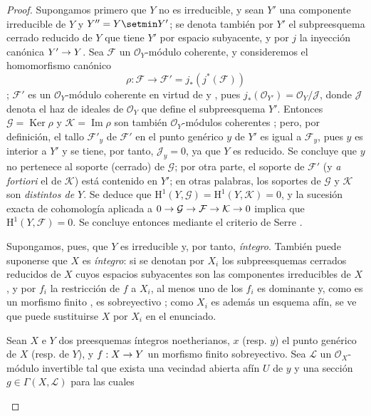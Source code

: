 \documentclass[oneside,10pt]{amsart}
\makeatletter
\newcommand{\ega@arrow}[2]{\mathchoice{#1}{#2}{#2}{#2}}
\renewcommand{\to}{\ega@arrow{\longrightarrow}{\rightarrow}}
\newcommand{\oldpage}[2][]{\marginnote{\normalfont\footnotesize\textbf{#1}~|~#2}\ignorespaces}
\let\EGAOriginalLabel\label
\renewcommand{\label}[1]{\phantomsection\EGAOriginalLabel{#1}}
\makeatother
\begin{document}
\begin{proof}
Supongamos primero que $Y$ no es irreducible, y sean $Y'$ una componente irreducible de $Y$ y $Y''=Y\setmin Y'$;
se denota también por $Y'$ el subpreesquema cerrado reducido de $Y$ que tiene $Y'$ por espacio subyacente, y por $j$ la inyección canónica $Y'\to Y$.
Sea $\mathcal{F}$ un $\mathcal{O}_Y$-módulo coherente, y consideremos el homomorfismo canónico
\[
\rho:\mathcal{F}\longrightarrow
\mathcal{F}'=j_*(j^*(\mathcal{F}))
\]
;
$\mathcal{F}'$ es un $\mathcal{O}_Y$-módulo coherente en virtud de  y , pues
$j_*(\mathcal{O}_{Y'})=\mathcal{O}_Y/\mathcal{J}$,
donde $\mathcal{J}$ denota el haz de ideales de $\mathcal{O}_Y$ que define el subpreesquema $Y'$.
Entonces $\mathcal{G}=\operatorname{Ker}\rho$ y $\mathcal{K}=\operatorname{Im}\rho$ son también $\mathcal{O}_Y$-módulos coherentes ;
pero, por definición, el tallo $\mathcal{F}'_y$ de $\mathcal{F}'$ en el punto genérico $y$ de $Y'$ es igual a $\mathcal{F}_y$, pues $y$ es interior a $Y'$ y se tiene, por tanto, $\mathcal{J}_y=0$, ya que $Y$ es reducido.
Se concluye que $y$ no pertenece al soporte (cerrado) de $\mathcal{G}$;
por otra parte, el soporte de $\mathcal{F}'$ (y \emph{a fortiori} el de $\mathcal{K}$) está contenido en $Y'$;
en otras palabras, los soportes de $\mathcal{G}$ y $\mathcal{K}$ son \emph{distintos de $Y$}.
Se deduce que
$\mathrm{H}^1(Y,\mathcal{G})=\mathrm{H}^1(Y,\mathcal{K})=0$,
y la sucesión exacta de cohomología aplicada a
$0\to\mathcal{G}\to\mathcal{F}\to\mathcal{K}\to0$
implica que $\mathrm{H}^1(Y,\mathcal{F})=0$.
Se concluye entonces mediante el criterio de Serre .

Supongamos, pues, que $Y$ es irreducible y, por tanto, \emph{íntegro}.
También puede suponerse que $X$ es \emph{íntegro}:
si se denotan por $X_i$ los subpreesquemas cerrados reducidos de $X$ cuyos espacios subyacentes son las componentes irreducibles de $X$ , y por $f_i$ la restricción de $f$ a $X_i$, al menos uno de los $f_i$ es dominante y, como es un morfismo finito , es sobreyectivo ;
como $X_i$ es además un esquema afín, se ve que puede sustituirse $X$ por $X_i$ en el enunciado.

\begin{lemma}[6.7.1.1]
\label{II.6.7.1.1-fr}
Sean $X$ e $Y$ dos preesquemas íntegros noetherianos, $x$ \textup{(resp. $y$)} el punto genérico de $X$ \textup{(resp. de $Y$)}, y $f:X\to Y$ un morfismo finito sobreyectivo.
Sea $\mathcal{L}$ un $\mathcal{O}_X$-módulo invertible tal que exista una vecindad abierta afín $U$ de $y$ y una sección $g\in\Gamma(X,\mathcal{L})$ para las cuales
\oldpage[II]{137}


\end{lemma}
\end{proof}
\end{document}
